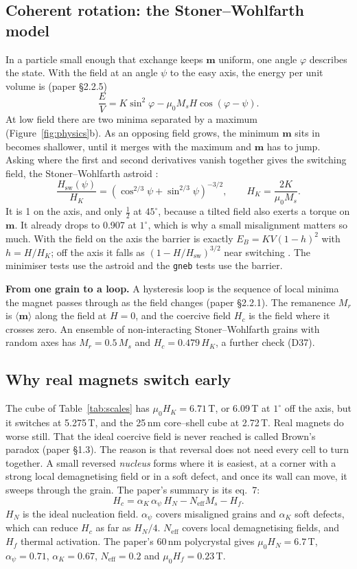 \documentclass[10pt,a4paper]{article}
\newcommand{\code}[1]{\texttt{#1}}
\newcommand{\mo}{\mu_0}
\newcommand{\vm}{\mathbf{m}}
\newcommand{\dec}[1]{\textcolor{comment}{\small(#1)}}
\begin{document}
\subsection{Coherent rotation: the Stoner--Wohlfarth model}
In a particle small enough that exchange keeps $\vm$ uniform, one angle $\varphi$ describes the state. With the field at
an angle $\psi$ to the easy axis, the energy per unit volume is (paper \S2.2.5)
\[
  \frac{E}{V} = K\sin^2\varphi - \mo M_s H\cos(\varphi-\psi).
\]
At low field there are two minima separated by a maximum (Figure~\ref{fig:physics}b). As an opposing field grows, the
minimum $\vm$ sits in becomes shallower, until it merges with the maximum and $\vm$ has to jump. Asking where the first
and second derivatives vanish together gives the switching field, the Stoner--Wohlfarth astroid \cite{stoner}:
\[
  \frac{H_\mathrm{sw}(\psi)}{H_K} = \left(\cos^{2/3}\psi + \sin^{2/3}\psi\right)^{-3/2}, \qquad H_K = \frac{2K}{\mo M_s}.
\]
It is 1 on the axis, and only $\frac12$ at $45^\circ$, because a tilted field also exerts a torque on $\vm$. It already
drops to 0.907 at $1^\circ$, which is why a small misalignment matters so much. With the field on the axis the barrier
is exactly $E_B = KV(1-h)^2$ with $h = H/H_K$; off the axis it falls as $(1-H/H_\mathrm{sw})^{3/2}$ near switching \cite{victora}. The
minimiser tests use the astroid and the \code{gneb} tests use the barrier.

\textbf{From one grain to a loop.} A hysteresis loop is the sequence of local minima the magnet passes through as the
field changes (paper \S2.2.1). The remanence $M_r$ is $\langle\vm\rangle$ along the field at $H=0$, and the coercive
field $H_c$ is the field where it crosses zero. An ensemble of non-interacting Stoner--Wohlfarth grains with random axes
has $M_r = 0.5\,M_s$ and $H_c = 0.479\,H_K$, a further check \dec{D37}.

\subsection{Why real magnets switch early}
The cube of Table~\ref{tab:scales} has $\mo H_K = 6.71$\,T, or 6.09\,T at $1^\circ$ off the axis, but it switches at
5.275\,T, and the 25\,nm core--shell cube at 2.72\,T. Real magnets do worse still. That the ideal coercive field is
never reached is called Brown's paradox (paper \S1.3). The reason is that reversal does not need every cell to turn
together. A small reversed \emph{nucleus} forms where it is easiest, at a corner with a strong local demagnetising
field or in a soft defect, and once its wall can move, it sweeps through the grain. The paper's summary is its eq.~7:
\[
  H_c = \alpha_K\,\alpha_\psi\,H_N - N_\mathrm{eff}M_s - H_f.
\]
$H_N$ is the ideal nucleation field. $\alpha_\psi$ covers misaligned grains and $\alpha_K$ soft defects, which can reduce
$H_c$ as far as $H_N/4$. $N_\mathrm{eff}$ covers local demagnetising fields, and $H_f$ thermal activation. The paper's
60\,nm polycrystal gives $\mo H_N = 6.7$\,T, $\alpha_\psi = 0.71$, $\alpha_K = 0.67$, $N_\mathrm{eff} = 0.2$ and
$\mo H_f = 0.23$\,T.
\end{document}
